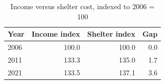 \begin{table}[htbp]
\centering
\caption{Income versus shelter cost, indexed to 2006 = 100}
\label{tab:squeeze}
\small
\begin{tabular}{lrrr}
\toprule
Year & Income index & Shelter index & Gap \\
\midrule
2006 & 100.0 & 100.0 & 0.0 \\
2011 & 133.3 & 135.0 & 1.7 \\
2021 & 133.5 & 137.1 & 3.6 \\
\bottomrule
\end{tabular}
\par{}
\end{table}
